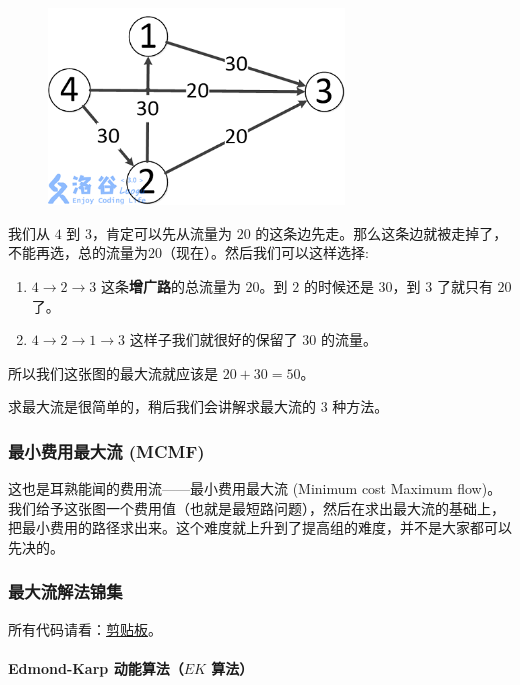 \begin{figure}[htbp]
\centering
\includegraphics[width=0.7\textwidth]{docs/graph/images/flow1.png} 

\end{figure}

我们从 $4$ 到 $3$，肯定可以先从流量为 $20$ 的这条边先走。那么这条边就被走掉了，不能再选，总的流量为$20$（现在）。然后我们可以这样选择:

\begin{enumerate}
\item $4\rightarrow2\rightarrow3$ 这条\textbf{增广路}的总流量为 $20$。到 $2$ 的时候还是 $30$，到 $3$ 了就只有 $20$ 了。
\item $4\rightarrow2\rightarrow1\rightarrow3$ 这样子我们就很好的保留了 $30$ 的流量。
\end{enumerate}

所以我们这张图的最大流就应该是 $20+30=50$。

求最大流是很简单的，稍后我们会讲解求最大流的 $3$ 种方法。

\subsubsection{最小费用最大流 (MCMF)}

这也是耳熟能闻的费用流——最小费用最大流 (Minimum cost Maximum flow)。我们给予这张图一个费用值（也就是最短路问题），然后在求出最大流的基础上，把最小费用的路径求出来。这个难度就上升到了提高组的难度，并不是大家都可以先决的。

\subsubsection{最大流解法锦集}

所有代码请看：\href{https://www.luogu.org/paste/6t8jgtxc}{剪贴板}。

\paragraph{Edmond-Karp 动能算法（$EK$ 算法）}

